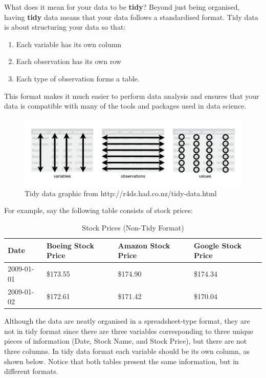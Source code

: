 \documentclass[
  letterpaper,
  DIV=11,
  numbers=noendperiod]{scrartcl}
\begin{document}
What does it mean for your data to be \textbf{tidy}? Beyond just being
organised, having \textbf{tidy} data means that your data follows a
standardised format. Tidy data is about structuring your data so that:

\begin{enumerate}
\def\labelenumi{\arabic{enumi}.}
\item
  Each variable has its own column
\item
  Each observation has its own row
\item
  Each type of observation forms a table.
\end{enumerate}

This format makes it much easier to perform data analysis and ensures
that your data is compatible with many of the tools and packages used in
data science.

\begin{figure}[H]

{\centering \includegraphics[width=6.4in,height=\textheight]{tidy-1.png}

}

\caption{Tidy data graphic from http://r4ds.had.co.nz/tidy-data.html}

\end{figure}%

For example, say the following table consists of stock prices:

\begingroup\fontsize{9}{11}\selectfont

\begin{longtable}[t]{llll}
\caption{\label{tab:unnamed-chunk-5}Stock Prices (Non-Tidy Format)}\\
\toprule
Date & Boeing Stock Price & Amazon Stock Price & Google Stock Price\\
\midrule
2009-01-01 & \$173.55 & \$174.90 & \$174.34\\
2009-01-02 & \$172.61 & \$171.42 & \$170.04\\
\bottomrule
\end{longtable}
\endgroup{}

Although the data are neatly organised in a spreadsheet-type format,
they are not in tidy format since there are three variables
corresponding to three unique pieces of information (Date, Stock Name,
and Stock Price), but there are not three columns. In tidy data format
each variable should be its own column, as shown below. Notice that both
tables present the same information, but in different formats.
\end{document}
